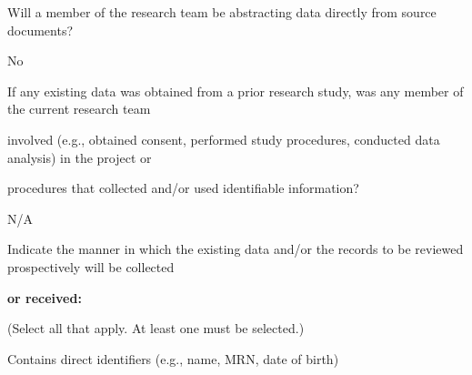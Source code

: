 \documentclass[10pt, letterpaper]{article}
\begin{document}
Will a member of the research team be abstracting data directly from source documents?

\begin{responsebox}

No

\vspace{0.5em}

\vspace{0.5em}

\vspace{0.5em}

\vspace{0.5em}

\end{responsebox}

If any existing data was obtained from a prior research study, was any member of the current research team

involved (e.g., obtained consent, performed study procedures, conducted data analysis) in the project or

procedures that collected and/or used identifiable information?

\vspace{0.5em}

\vspace{0.5em}

\begin{responsebox}

N/A

\vspace{0.5em}

\vspace{0.5em}

\vspace{0.5em}

\vspace{0.5em}

\end{responsebox}

Indicate the manner in which the existing data and/or the records to be reviewed prospectively will be collected

\noindent \textbf{or received:}

(Select all that apply. At least one must be selected.)

\vspace{0.5em}

\vspace{0.5em}

\noindent \makebox[0pt][l]{\color{columbiablue_official}$\boxtimes$}\hspace{1.2em} Contains direct identifiers (e.g., name, MRN, date of birth)
\end{document}
